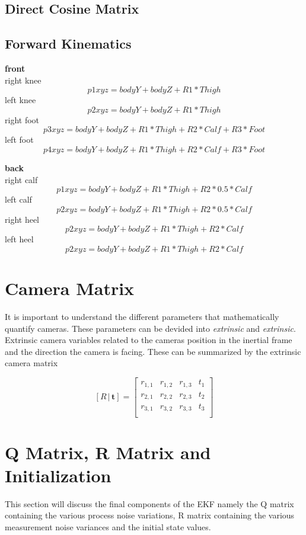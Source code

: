 \subsection{Direct Cosine Matrix}


\subsection{Forward Kinematics}

\textbf{front}\\
right knee
$$ p1xyz = bodyY + bodyZ + R1 * Thigh $$
left knee
$$ p2xyz = bodyY + bodyZ + R1 * Thigh $$
right foot
$$ p3xyz = bodyY + bodyZ + R1 * Thigh + R2 * Calf + R3 * Foot $$
left foot
$$ p4xyz = bodyY + bodyZ + R1 * Thigh + R2 * Calf + R3 * Foot $$

\textbf{back}\\
right calf
$$ p1xyz = bodyY + bodyZ + R1 * Thigh + R2 * 0.5 * Calf $$
left calf
$$ p2xyz = bodyY + bodyZ + R1 * Thigh + R2 * 0.5 * Calf $$
right heel
$$ p2xyz = bodyY + bodyZ + R1 * Thigh + R2 * Calf $$
left heel
$$ p2xyz = bodyY + bodyZ + R1 * Thigh + R2 * Calf $$

\section{Camera Matrix}

It is important to understand the different parameters that mathematically quantify cameras. These parameters can be devided into \textit{extrinsic} and \textit{extrinsic}. Extrinsic camera variables related to the cameras position in the inertial frame and the direction the camera is facing. These can be summarized by the extrinsic camera matrix 

$$[ R \, |\, \boldsymbol{t}] = 
\left[ \begin{array}{ccc|c} 
r_{1,1} & r_{1,2} & r_{1,3} & t_1 \\
r_{2,1} & r_{2,2} & r_{2,3} & t_2 \\
r_{3,1} & r_{3,2} & r_{3,3} & t_3 \\
\end{array} \right]$$


\section{Q Matrix, R Matrix and Initialization}
This section will discuss the final components of the EKF namely the Q matrix containing the various process noise variations, R matrix containing the various measurement noise variances and the initial state values.

